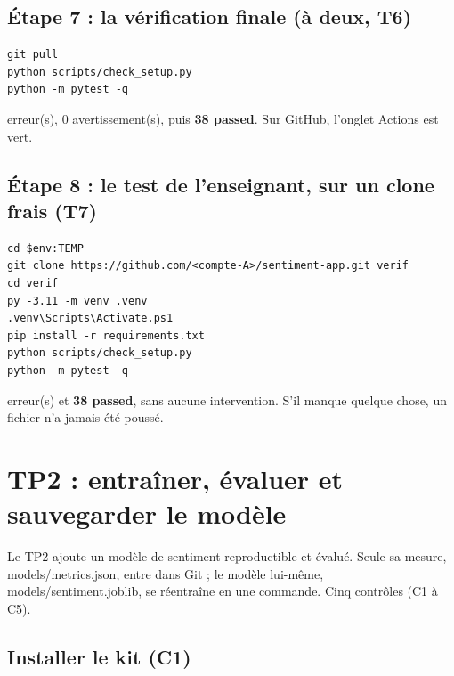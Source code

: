 \documentclass[11pt,a4paper]{article}
\newcommand{\co}[1]{{\ttfamily\hyphenchar\font=45\relax #1}}
\begin{document}
\subsection{Étape 7 : la vérification finale (à deux, T6)}

\begin{lstlisting}
git pull
python scripts/check_setup.py
python -m pytest -q
\end{lstlisting}

\begin{attendu}
\co{0 erreur(s), 0 avertissement(s)}, puis \textbf{38 passed}. Sur GitHub, l'onglet Actions est vert.
\end{attendu}

\subsection{Étape 8 : le test de l'enseignant, sur un clone frais (T7)}

\begin{lstlisting}
cd $env:TEMP
git clone https://github.com/<compte-A>/sentiment-app.git verif
cd verif
py -3.11 -m venv .venv
.venv\Scripts\Activate.ps1
pip install -r requirements.txt
python scripts/check_setup.py
python -m pytest -q
\end{lstlisting}

\begin{attendu}
\co{0 erreur(s)} et \textbf{38 passed}, sans aucune intervention. S'il manque quelque chose, un fichier n'a
jamais été poussé.
\end{attendu}

\section{TP2 : entraîner, évaluer et sauvegarder le modèle}

Le TP2 ajoute un modèle de sentiment reproductible et évalué. Seule sa mesure, \co{models/metrics.json},
entre dans Git ; le modèle lui-même, \co{models/sentiment.joblib}, se réentraîne en une commande. Cinq
contrôles (C1 à C5).

\subsection{Installer le kit (C1)}
\end{document}
